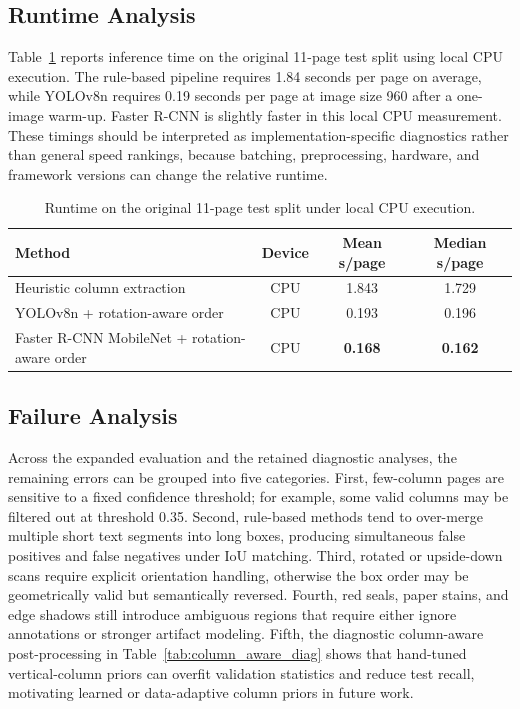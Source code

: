 \documentclass[12pt]{article}
\begin{document}
\subsection{Runtime Analysis}
Table~\ref{tab:runtime} reports inference time on the original 11-page test split using local CPU execution. The rule-based pipeline requires 1.84 seconds per page on average, while YOLOv8n requires 0.19 seconds per page at image size 960 after a one-image warm-up. Faster R-CNN is slightly faster in this local CPU measurement. These timings should be interpreted as implementation-specific diagnostics rather than general speed rankings, because batching, preprocessing, hardware, and framework versions can change the relative runtime.

\begin{table}[t]
\centering
\scriptsize\setlength{\tabcolsep}{3pt}
\caption{Runtime on the original 11-page test split under local CPU execution.}
\label{tab:runtime}
\begin{tabular}{lccc}
\toprule
Method & Device & Mean s/page & Median s/page \\
\midrule
Heuristic column extraction & CPU & 1.843 & 1.729 \\
YOLOv8n + rotation-aware order & CPU & 0.193 & 0.196 \\
Faster R-CNN MobileNet + rotation-aware order & CPU & \textbf{0.168} & \textbf{0.162} \\
\bottomrule
\end{tabular}
\end{table}

\subsection{Failure Analysis}
Across the expanded evaluation and the retained diagnostic analyses, the remaining errors can be grouped into five categories. First, few-column pages are sensitive to a fixed confidence threshold; for example, some valid columns may be filtered out at threshold 0.35. Second, rule-based methods tend to over-merge multiple short text segments into long boxes, producing simultaneous false positives and false negatives under IoU matching. Third, rotated or upside-down scans require explicit orientation handling, otherwise the box order may be geometrically valid but semantically reversed. Fourth, red seals, paper stains, and edge shadows still introduce ambiguous regions that require either ignore annotations or stronger artifact modeling. Fifth, the diagnostic column-aware post-processing in Table~\ref{tab:column_aware_diag} shows that hand-tuned vertical-column priors can overfit validation statistics and reduce test recall, motivating learned or data-adaptive column priors in future work.
\end{document}
